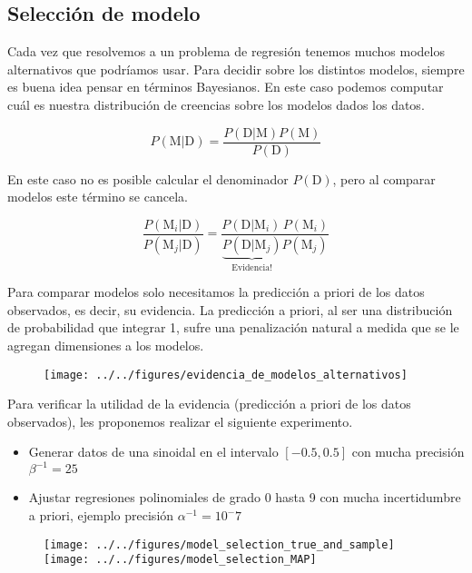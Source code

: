 \documentclass[a4paper,10pt]{article}
\begin{document}
\subsection{Selecci\'on de modelo}\label{ssec:seleccion}

Cada vez que resolvemos a un problema de regresi\'on tenemos muchos modelos alternativos que podr\'iamos usar.
Para decidir sobre los distintos modelos, siempre es buena idea pensar en t\'erminos Bayesianos.
En este caso podemos computar cu\'al es nuestra distribuci\'on de creencias sobre los modelos dados los datos.

\begin{equation*}
 P(\text{M}|\text{D}) = \frac{P(\text{D}|\text{M})P(\text{M})}{ P(\text{D})}
\end{equation*}

En este caso no es posible calcular el denominador $P(\text{D})$, pero al comparar modelos este t\'ermino se cancela.

\begin{equation*}
  \frac{P(\text{M}_i|\text{D})}{P(\text{M}_j|\text{D})}  = \frac{P(\text{D}|\text{M}_i)\,P(\text{M}_i)}{ \underbrace{P(\text{D}|\text{M}_j)}_{\text{Evidencia!}}P(\text{M}_j)}  
\end{equation*}

Para comparar modelos solo necesitamos la predicci\'on a priori de los datos observados, es decir, su evidencia.
La predicci\'on a priori, al ser una distribuci\'on de probabilidad que integrar 1, sufre una penalizaci\'on natural a medida que se le agregan dimensiones a los modelos.

\begin{figure}[H]
\centering
  \texttt{[image: ../../figures/evidencia\_de\_modelos\_alternativos]} 
\end{figure}

Para verificar la utilidad de la evidencia (predicci\'on a priori de los datos observados), les proponemos realizar el siguiente experimento.

\begin{itemize}
  \item Generar datos de una sinoidal en el intervalo $[-0.5,0.5]$ con mucha precisi\'on $\beta^{-1} =25$
 \item Ajustar regresiones polinomiales de grado 0 hasta 9 con mucha incertidumbre a priori, ejemplo precisi\'on $\alpha^{-1}=10^-{7}$
\end{itemize}

\begin{figure}[H]
\centering
 \texttt{[image: ../../figures/model\_selection\_true\_and\_sample]} 
 \texttt{[image: ../../figures/model\_selection\_MAP]} 
\end{figure}
\end{document}
